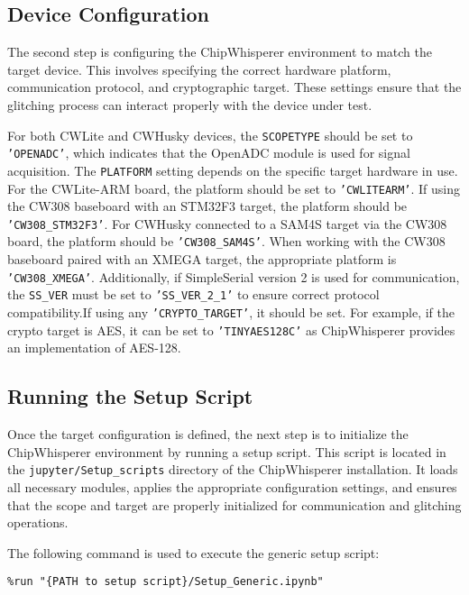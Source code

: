 \subsection{Device Configuration}

The second step is configuring the ChipWhisperer environment to match the target device. This involves specifying the correct hardware platform, communication protocol, and cryptographic target. These settings ensure that the glitching process can interact properly with the device under test.

For both CWLite and CWHusky devices, the \texttt{SCOPETYPE} should be set to \texttt{'OPENADC'}, which indicates that the OpenADC module is used for signal acquisition. The \texttt{PLATFORM} setting depends on the specific target hardware in use. For the CWLite-ARM board, the platform should be set to \texttt{'CWLITEARM'}. If using the CW308 baseboard with an STM32F3 target, the platform should be \texttt{'CW308\_STM32F3'}. For CWHusky connected to a SAM4S target via the CW308 board, the platform should be \texttt{'CW308\_SAM4S'}. When working with the CW308 baseboard paired with an XMEGA target, the appropriate platform is \texttt{'CW308\_XMEGA'}. Additionally, if SimpleSerial version 2 is used for communication, the \texttt{SS\_VER} must be set to \texttt{'SS\_VER\_2\_1'} to ensure correct protocol compatibility.If using any \texttt{'CRYPTO\_TARGET'}, it should be set. For example, if the crypto target is AES, it can be set to \texttt{'TINYAES128C'} as ChipWhisperer provides an implementation of AES-128.

\subsection{Running the Setup Script}

Once the target configuration is defined, the next step is to initialize the ChipWhisperer environment by running a setup script. This script is located in the \texttt{jupyter/Setup\_scripts} directory of the ChipWhisperer installation. It loads all necessary modules, applies the appropriate configuration settings, and ensures that the scope and target are properly initialized for communication and glitching operations.


The following command is used to execute the generic setup script:

\begin{verbatim}
%run "{PATH to setup script}/Setup_Generic.ipynb"
\end{verbatim}

